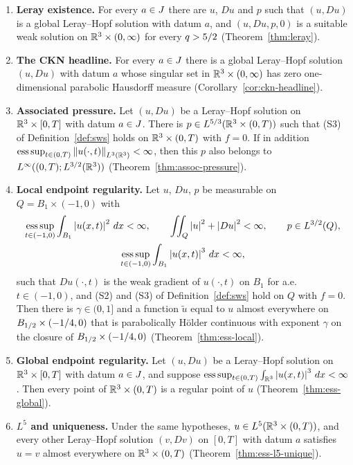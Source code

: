 \documentclass[11pt,letterpaper]{article}
\numberwithin{equation}{section}
\theoremstyle{plain}
\theoremstyle{definition}
\theoremstyle{remark}
\begin{document}
\begin{enumerate}[label=\textbf{(\Alph*)},leftmargin=2.8em]
\item \textbf{Leray existence.} For every $a\in J$ there are $u$, $Du$ and $p$ such that $(u,Du)$ is a global Leray--Hopf solution with datum $a$, and $(u,Du,p,0)$ is a suitable weak solution on $\mathbb{R}^3\times(0,\infty)$ for every $q>5/2$ (Theorem~\ref{thm:leray}).

\item \textbf{The CKN headline.} For every $a\in J$ there is a global Leray--Hopf solution $(u,Du)$ with datum $a$ whose singular set in $\mathbb{R}^3\times(0,\infty)$ has zero one-dimensional parabolic Hausdorff measure (Corollary~\ref{cor:ckn-headline}).

\item \textbf{Associated pressure.} Let $(u,Du)$ be a Leray--Hopf solution on $\mathbb{R}^3\times[0,T]$ with datum $a\in J$. There is $p\in L^{5/3}(\mathbb{R}^3\times(0,T))$ such that (S3) of Definition~\ref{def:sws} holds on $\mathbb{R}^3\times(0,T)$ with $f=0$. If in addition $\operatorname*{ess\,sup}_{t\in(0,T)}\left\lVert u(\cdot,t)\right\rVert_{L^3(\mathbb{R}^3)}<\infty$, then this $p$ also belongs to $L^\infty((0,T);L^{3/2}(\mathbb{R}^3))$ (Theorem~\ref{thm:assoc-pressure}).

\item \textbf{Local endpoint regularity.} Let $u$, $Du$, $p$ be measurable on $Q=B_1\times(-1,0)$ with
\begin{gather*}
\operatorname*{ess\,sup}_{t\in(-1,0)}\int_{B_1}\left\lvert u(x,t)\right\rvert^2\,dx<\infty,\qquad
\iint_Q\left\lvert u\right\rvert^2+\left\lvert Du\right\rvert^2<\infty,\qquad
p\in L^{3/2}(Q),\\
\operatorname*{ess\,sup}_{t\in(-1,0)}\int_{B_1}\left\lvert u(x,t)\right\rvert^3\,dx<\infty,
\end{gather*}
such that $Du(\cdot,t)$ is the weak gradient of $u(\cdot,t)$ on $B_1$ for a.e. $t\in(-1,0)$, and (S2) and (S3) of Definition~\ref{def:sws} hold on $Q$ with $f=0$. Then there is $\gamma\in(0,1]$ and a function $\tilde u$ equal to $u$ almost everywhere on $B_{1/2}\times(-1/4,0)$ that is parabolically H\"older continuous with exponent $\gamma$ on the closure of $B_{1/2}\times(-1/4,0)$ (Theorem~\ref{thm:ess-local}).

\item \textbf{Global endpoint regularity.} Let $(u,Du)$ be a Leray--Hopf solution on $\mathbb{R}^3\times[0,T]$ with datum $a\in J$, and suppose $\operatorname*{ess\,sup}_{t\in(0,T)}\int_{\mathbb{R}^3}\left\lvert u(x,t)\right\rvert^3\,dx<\infty$. Then every point of $\mathbb{R}^3\times(0,T)$ is a regular point of $u$ (Theorem~\ref{thm:ess-global}).

\item \textbf{$L^5$ and uniqueness.} Under the same hypotheses, $u\in L^5(\mathbb{R}^3\times(0,T))$, and every other Leray--Hopf solution $(v,Dv)$ on $[0,T]$ with datum $a$ satisfies $u=v$ almost everywhere on $\mathbb{R}^3\times(0,T)$ (Theorem~\ref{thm:ess-l5-unique}).


\end{enumerate}
\end{document}
